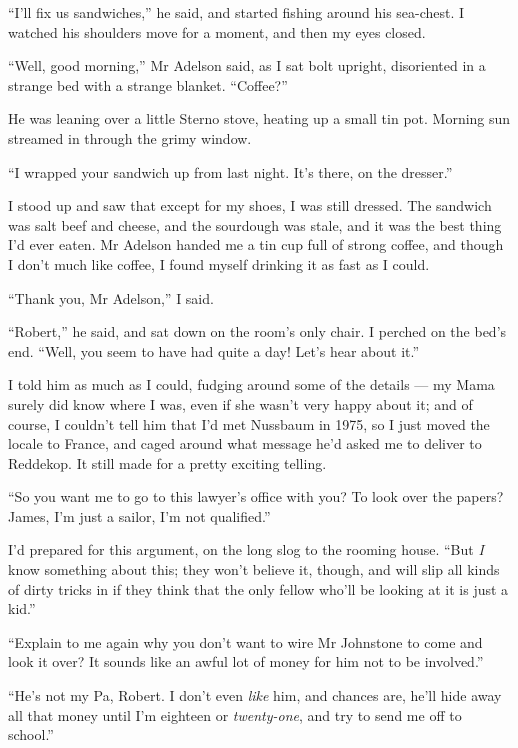 ``I'll fix us sandwiches,'' he said, and started fishing around his
sea-chest. I watched his shoulders move for a moment, and then my
eyes closed.

\tb

``Well, good morning,'' Mr Adelson said, as I sat bolt upright,
disoriented in a strange bed with a strange blanket. ``Coffee?''

He was leaning over a little Sterno stove, heating up a small tin
pot. Morning sun streamed in through the grimy window.

``I wrapped your sandwich up from last night. It's there, on the dresser.''

I stood up and saw that except for my shoes, I was still dressed.
The sandwich was salt beef and cheese, and the sourdough was stale,
and it was the best thing I'd ever eaten. Mr Adelson handed me a
tin cup full of strong coffee, and though I don't much like coffee,
I found myself drinking it as fast as I could.

``Thank you, Mr Adelson,'' I said.

``Robert,'' he said, and sat down on the room's only chair. I
perched on the bed's end.
``Well, you seem to have had quite a day! Let's hear about it.''

I told him as much as I could, fudging around some of the details
--- my Mama surely did know where I was, even if she wasn't very
happy about it; and of course, I couldn't tell him that I'd met
Nussbaum in 1975, so I just moved the locale to France, and caged
around what message he'd asked me to deliver to Reddekop. It still
made for a pretty exciting telling.

``So you want me to go to this lawyer's office with you? To look over the 
papers? James, I'm just a sailor, I'm not qualified.''

I'd prepared for this argument, on the long slog to the rooming
house.
``But \emph{I} know something about this; they won't believe it, though, and 
will slip all kinds of dirty tricks in if they think that the only fellow 
who'll be looking at it is just a kid.''

``Explain to me again why you don't want to wire Mr Johnstone to come and look 
it over? It sounds like an awful lot of money for him not to be involved.''

``He's not my Pa, Robert. I don't even \emph{like} him, and chances are, he'll 
hide away all that money until I'm eighteen or \emph{twenty-one}, and try to 
send me off to school.''

